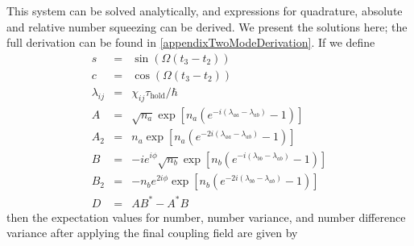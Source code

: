\documentclass{iopart}
\begin{document}
This system can be solved analytically, and expressions for quadrature, absolute and relative number squeezing can be derived. We present the solutions here; the full derivation can be found in \ref{appendixTwoModeDerivation}.
If we define
\begin{eqnarray}
s &=& \sin(\Omega (t_3 - t_2)) \label{eqsDef} \\
c &=& \cos(\Omega (t_3 - t_2)) \\
\lambda_{ij} &=& \chi_{ij} \tau_{\mathrm{hold}} / \hbar \\
A &=& \sqrt{n_a} \exp [n_a (e^{-i(\lambda_{aa}-\lambda_{ab})} - 1 )] \\
A_2 &=& n_a \exp [n_a (e^{-2i(\lambda_{aa}-\lambda_{ab})} - 1 )] \\
B &=& -i e^{i \phi}\sqrt{n_b} \exp [n_b (e^{-i(\lambda_{bb}-\lambda_{ab})} - 1 )] \\
B_2 &=& -n_b e^{2i\phi} \exp [n_b (e^{-2i(\lambda_{bb}-\lambda_{ab})} - 1 )] \\
D &=& AB^* - A^*B \label{eqDDef}
\end{eqnarray}
then the expectation values for number, number variance, and number difference variance after applying the final coupling field are given by
\end{document}
